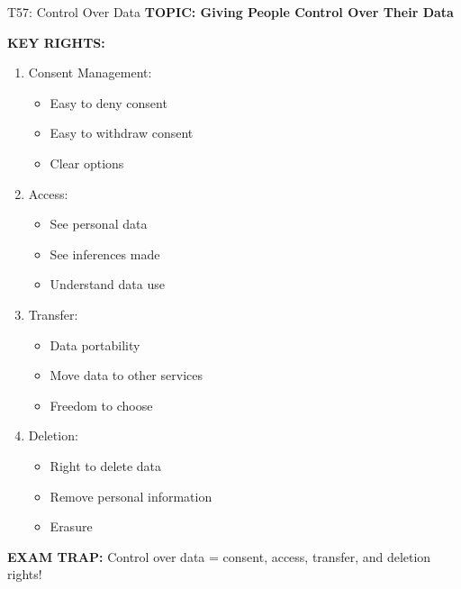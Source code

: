 \documentclass[8pt]{beamer}
\begin{document}
	\begin{frame}{T57: Control Over Data}
		\fontsize{6.5}{7.5}\selectfont
		\textbf{TOPIC: Giving People Control Over Their Data}
		
		\vspace{0.1cm}
		\textbf{KEY RIGHTS:}
		\begin{enumerate}
			\item \textcolor{myblue}{Consent Management:}
			\begin{itemize}
				\item Easy to deny consent
				\item Easy to withdraw consent
				\item Clear options
			\end{itemize}
			\item \textcolor{myblue}{Access:}
			\begin{itemize}
				\item See personal data
				\item See inferences made
				\item Understand data use
			\end{itemize}
			\item \textcolor{myblue}{Transfer:}
			\begin{itemize}
				\item Data portability
				\item Move data to other services
				\item Freedom to choose
			\end{itemize}
			\item \textcolor{myblue}{Deletion:}
			\begin{itemize}
				\item Right to delete data
				\item Remove personal information
				\item Erasure
			\end{itemize}
		\end{enumerate}
		
		\textcolor{myred}{\textbf{EXAM TRAP:}} Control over data = \textcolor{myblue}{consent, access, transfer, and deletion rights}!
	\end{frame}
	
\end{document}
